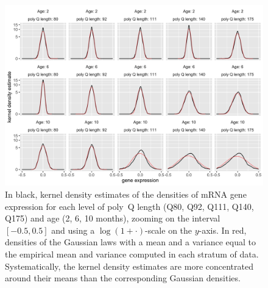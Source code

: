 \begin{figure}[h]
  \centering
  \includegraphics[width=\textwidth]{images/KDE_mRNA.png}
  \caption{In black,  kernel density estimates  of the densities  of mRNA
      gene expression for  each level of poly~Q length (Q80,  Q92, Q111, Q140,
      Q175) and age  (2, 6, 10 months), zooming on  the interval $[-0.5, 0.5]$
      and using a $\log(1+\cdot)$-scale on the $y$-axis.  In red, densities of
      the Gaussian laws with a mean and a variance equal to the empirical mean
      and  variance computed  in each  stratum of  data.  Systematically,  the
      kernel density estimates  are more concentrated around  their means than
      the corresponding Gaussian densities.}
  \label{fig:KDE_mRNA}
\end{figure}

